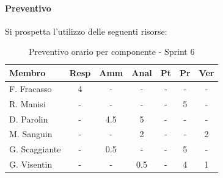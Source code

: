 \documentclass[a4paper,12pt]{article}
\begin{document}
\paragraph{Preventivo}
Si prospetta l'utilizzo delle seguenti risorse:

\begin{table}[H]
    \centering
    \renewcommand{\arraystretch}{1.3}
    \small 
    \begin{tabularx}{\textwidth}{|l|C|C|C|C|C|C|}
        \hline
        \textbf{Membro} & \textbf{Resp} & \textbf{Amm} & \textbf{Anal} & \textbf{Pt} & \textbf{Pr} & \textbf{Ver} \\
        \hline
        F. Fracasso & 4 & - & - & - & - & - \\
        \hline
        R. Manisi & - & - & - & - & 5 & - \\
        \hline
        D. Parolin & - & 4.5 & 5 & - & - & - \\
        \hline
        M. Sanguin & - & - & 2 & - & - & 2 \\
        \hline
        G. Scaggiante & - & 0.5 & - & - & 5 & - \\
        \hline
        G. Visentin & - & - & 0.5 & - & 4 & 1 \\
        \hline
    \end{tabularx}
    \caption{Preventivo orario per componente - Sprint 6}
    \label{tab:preventivo_sprint6}
\end{table}
\end{document}
